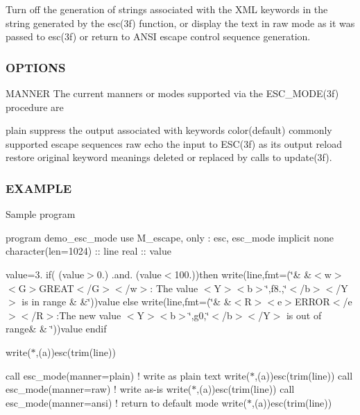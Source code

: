 Turn off the generation of strings associated with the X\+ML keywords in the string generated by the esc(3f) function, or display the text in raw mode as it was passed to esc(3f) or return to A\+N\+SI escape control sequence generation.

\subsubsection*{O\+P\+T\+I\+O\+NS}

M\+A\+N\+N\+ER The current manners or modes supported via the E\+S\+C\+\_\+\+M\+O\+D\+E(3f) procedure are

plain suppress the output associated with keywords color(default) commonly supported escape sequences raw echo the input to E\+S\+C(3f) as its output reload restore original keyword meanings deleted or replaced by calls to update(3f).

\subsubsection*{E\+X\+A\+M\+P\+LE}

Sample program

program demo\+\_\+esc\+\_\+mode use M\+\_\+escape, only \+: esc, esc\+\_\+mode implicit none character(len=1024) \+:\+: line real \+:\+: value

value=3. if( (value$>$0.) .and. (value$<$100.))then write(line,fmt=\textquotesingle{}(\char`\"{}\&
       \&$<$w$>$$<$\+G$>$\+G\+R\+E\+A\+T$<$/\+G$>$$<$/w$>$\+: The value $<$\+Y$>$$<$b$>$\char`\"{},f8.,\char`\"{}$<$/b$>$$<$/\+Y$>$ is in range \&
       \&\char`\"{})\textquotesingle{})value else write(line,fmt=\textquotesingle{}(\char`\"{}\&
       \&$<$\+R$>$$<$e$>$\+E\+R\+R\+O\+R$<$/e$>$$<$/\+R$>$\+:\+The new value $<$\+Y$>$$<$b$>$\char`\"{},g0,\char`\"{}$<$/b$>$$<$/\+Y$>$ is out of range\&
       \& \char`\"{})\textquotesingle{})value endif

write($\ast$,\textquotesingle{}(a)\textquotesingle{})esc(trim(line))

call esc\+\_\+mode(manner=\textquotesingle{}plain\textquotesingle{}) ! write as plain text write($\ast$,\textquotesingle{}(a)\textquotesingle{})esc(trim(line)) call esc\+\_\+mode(manner=\textquotesingle{}raw\textquotesingle{}) ! write as-\/is write($\ast$,\textquotesingle{}(a)\textquotesingle{})esc(trim(line)) call esc\+\_\+mode(manner=\textquotesingle{}ansi\textquotesingle{}) ! return to default mode write($\ast$,\textquotesingle{}(a)\textquotesingle{})esc(trim(line))

